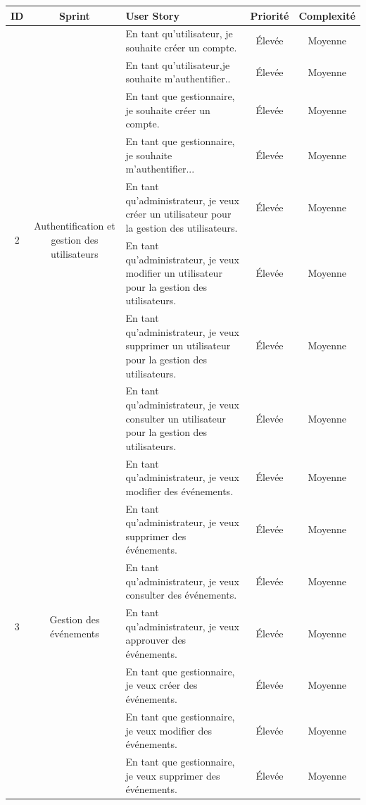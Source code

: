\begin{table}[h!]
\renewcommand{\arraystretch}{1.6}
\setlength{\tabcolsep}{5pt}
\centering
\begin{tabular}{|c|c|m{7cm}|c|c|}
\hline
\textbf{ID} & \textbf{Sprint} & \textbf{User Story} & \textbf{Priorité} & \textbf{Complexité} \\
\hline

\multirow{8}{*}{2} & \multirow{8}{*}{\parbox{3cm}{\centering Authentification et gestion des utilisateurs}} 
& En tant qu'utilisateur, je souhaite créer un compte. & Élevée & Moyenne \\
\cline{3-5}
&& En tant qu'utilisateur,je souhaite m’authentifier.. & Élevée & Moyenne \\
\cline{3-5}
&& En tant que gestionnaire, je souhaite créer un compte. & Élevée & Moyenne \\
\cline{3-5}
&& En tant que gestionnaire, je souhaite m’authentifier... & Élevée & Moyenne \\
\cline{3-5}
& & En tant qu’administrateur, je veux créer un utilisateur pour la gestion des utilisateurs. & Élevée & Moyenne \\
\cline{3-5}

& & En tant qu’administrateur, je veux modifier un utilisateur pour la gestion des utilisateurs. & Élevée & Moyenne \\
\cline{3-5}
& & En tant qu’administrateur, je veux supprimer un utilisateur pour la gestion des utilisateurs. & Élevée & Moyenne \\
\cline{3-5}
& & En tant qu’administrateur, je veux consulter un utilisateur pour la gestion des utilisateurs. & Élevée & Moyenne \\
\cline{3-5}
\hline

\multirow{7}{*}{3} & \multirow{7}{*}{\parbox{3cm}{\centering Gestion des événements}} 
& En tant qu’administrateur, je veux modifier des événements. & Élevée & Moyenne \\
\cline{3-5}
& & En tant qu’administrateur, je veux supprimer des événements. & Élevée & Moyenne \\
\cline{3-5}
& & En tant qu’administrateur, je veux consulter des événements. & Élevée & Moyenne \\
\cline{3-5}
& & En tant qu’administrateur, je veux approuver des événements. & Élevée & Moyenne \\
\cline{3-5}
& & En tant que gestionnaire, je veux créer des événements. & Élevée & Moyenne \\
\cline{3-5}
& & En tant que gestionnaire, je veux modifier des événements. & Élevée & Moyenne \\
\cline{3-5}
& & En tant que gestionnaire, je veux supprimer des événements. & Élevée & Moyenne \\
\hline
\end{tabular}
\end{table}

